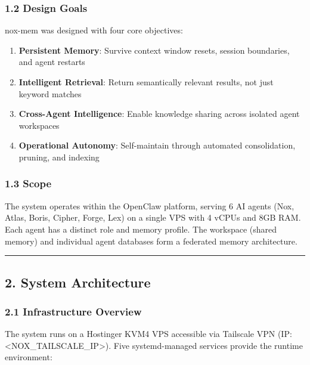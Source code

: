 \documentclass[
]{article}
\providecommand{\tightlist}{%
  \setlength{\itemsep}{0pt}\setlength{\parskip}{0pt}}
\begin{document}
\subsubsection{1.2 Design Goals}\label{design-goals}

nox-mem was designed with four core objectives:

\begin{enumerate}
\def\labelenumi{\arabic{enumi}.}
\tightlist
\item
  \textbf{Persistent Memory}: Survive context window resets, session
  boundaries, and agent restarts
\item
  \textbf{Intelligent Retrieval}: Return semantically relevant results,
  not just keyword matches
\item
  \textbf{Cross-Agent Intelligence}: Enable knowledge sharing across
  isolated agent workspaces
\item
  \textbf{Operational Autonomy}: Self-maintain through automated
  consolidation, pruning, and indexing
\end{enumerate}

\subsubsection{1.3 Scope}\label{scope}

The system operates within the OpenClaw platform, serving 6 AI agents
(Nox, Atlas, Boris, Cipher, Forge, Lex) on a single VPS with 4 vCPUs and
8GB RAM. Each agent has a distinct role and memory profile. The
workspace (shared memory) and individual agent databases form a
federated memory architecture.

\begin{center}\rule{0.5\linewidth}{0.5pt}\end{center}

\subsection{2. System Architecture}\label{system-architecture}

\subsubsection{2.1 Infrastructure
Overview}\label{infrastructure-overview}

The system runs on a Hostinger KVM4 VPS accessible via Tailscale VPN
(IP: <NOX_TAILSCALE_IP>). Five systemd-managed services provide the runtime
environment:
\end{document}
